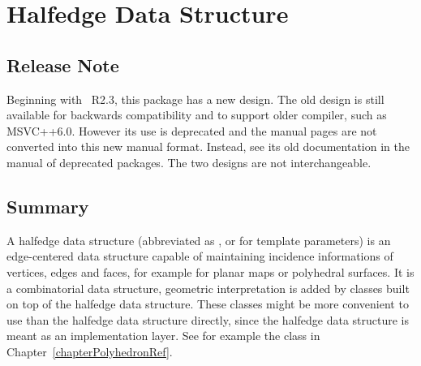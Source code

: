 
\clearpage
\chapter{Halfedge Data Structure}
\label{chapterHalfedgeDSRef}

\section*{Release Note}

Beginning with \cgal\ R2.3, this package has a new design.  The old
design is still available for backwards compatibility and to support
older compiler, such as MSVC++6.0. However its use is deprecated and
the manual pages are not converted into this new manual
format. Instead, see its old documentation in the manual of 
deprecated packages. The two designs are not interchangeable.

\section*{Summary}

A halfedge data structure (abbreviated as , or
 for template parameters) is an edge-centered data structure
capable of maintaining incidence informations of vertices, edges and
faces, for example for planar maps or polyhedral surfaces. It is a
combinatorial data structure, geometric interpretation is added by
classes built on top of the halfedge data structure.  These classes
might be more convenient to use than the halfedge data structure
directly, since the halfedge data structure is meant as an
implementation layer.  See for example the 
class in Chapter~\ref{chapterPolyhedronRef}.

